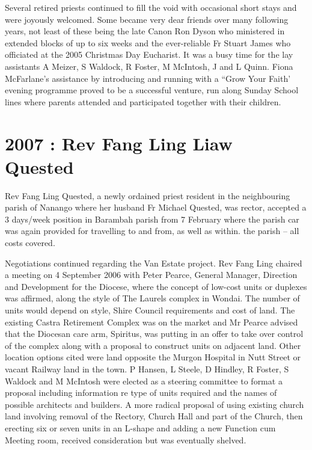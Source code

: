 Several retired priests continued to fill the void with occasional short stays and were joyously welcomed. Some became very dear friends over many following years, not least of these being the late Canon Ron Dyson who ministered in extended blocks of up to six weeks and the ever-reliable Fr Stuart James who officiated at the 2005 Christmas Day Eucharist. It was a busy time for the lay assistants A Meizer, S Waldock, R Foster, M McIntosh, J and L Quinn. Fiona McFarlane's assistance by introducing and running with a ``Grow Your Faith' evening programme proved to be a successful venture, run along Sunday School lines where parents attended and participated together with their children.



\section{2007 : Rev Fang Ling Liaw Quested}



Rev Fang Ling Quested, a newly ordained priest resident in the neighbouring parish of Nanango where her husband Fr Michael Quested, was rector, accepted a 3 days/week position in Barambah parish from 7 February where the parish car was again provided for travelling to and from, as well as within. the parish -- all costs covered.



Negotiations continued regarding the Van Estate project. Rev Fang Ling chaired a meeting on 4 September 2006 with Peter Pearce, General Manager, Direction and Development for the Diocese, where the concept of low-cost units or duplexes was affirmed, along the style of The Laurels complex in Wondai. The number of units would depend on style, Shire Council requirements and cost of land. The existing Castra Retirement Complex was on the market and Mr Pearce advised that the Diocesan care arm, Spiritus, was putting in an offer to take over control of the complex along with a proposal to construct units on adjacent land. Other location options cited were land opposite the Murgon Hospital in Nutt Street or vacant Railway land in the town. P Hansen, L Steele, D Hindley, R Foster, S Waldock and M McIntosh were elected as a steering committee to format a proposal including information re type of units required and the names of possible architects and builders. A more radical proposal of using existing church land involving removal of the Rectory, Church Hall and part of the Church, then erecting six or seven units in an L-shape and adding a new Function cum Meeting room, received consideration but was eventually shelved.



